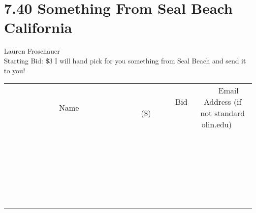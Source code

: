 \documentclass[11pt]{article}
\begin{document}
\section*{7.40 Something From Seal Beach California}
Lauren Froschauer
\\
Starting Bid: \$3
\newline
I will hand pick for you something from Seal Beach and send it to you!
\\[6ex]
\begin{tabular}{c c c}
~~~~~~~~~~~~~Name~~~~~~~~~~~~~ & ~~~~~~~~~Bid (\$)~~~~~~~~~  & ~~~Email Address (if not standard olin.edu)~~~\\
 & & \\
\hline
 & & \\
\hline
 & & \\
\hline
 & & \\
\hline
 & & \\
\hline
 & & \\
\hline
 & & \\
\hline
 & & \\
\hline
 & & \\
\hline
 & & \\
\hline
 & & \\
\hline
 & & \\
\hline
 & & \\
\hline
 & & \\
\hline
 & & \\
\hline
 & & \\
\hline
 & & \\
\hline
 & & \\
\hline
 & & \\
\hline
 & & \\
\hline
 & & \\
\hline
 & & \\
\hline
 & & \\
\hline
 & & \\
\hline
 & & \\
\hline
 & & \\
\hline
\end{tabular}
\newpage
\end{document}
